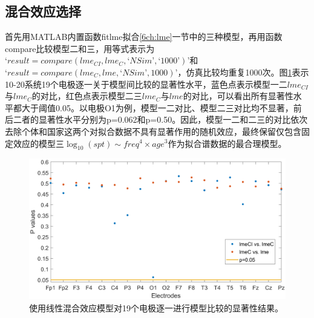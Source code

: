 \subsection{混合效应选择}
首先用MATLAB内置函数fitlme拟合\ref{6ch:lme}一节中的三种模型，再用函数compare比较模型二和三，用等式表示为$‘result = compare(lme_{CI}, lme_C, ‘NSim’, ‘1000’)’$和$‘result = compare (lme_C, lme, ‘NSim’, 1000)’$，仿真比较均重复1000次。图\ref{6:pv}表示10-20系统19个电极逐一关于模型间比较的显著性水平，蓝色点表示模型一二$lme_{CI}$与$lme_C$的对比，红色点表示模型二三$lme_C$与$lme$的对比，可以看出所有显著性水平都大于阈值0.05。以电极O1为例，模型一二对比、模型二三对比均不显著，前后二者的显著性水平分别为p=0.062和p=0.50。因此，模型一二和二三的对比依次去除个体和国家这两个对拟合数据不具有显著作用的随机效应，最终保留仅包含固定效应的模型三$\log_{10}(spt)\sim{freq^4\times{age^3}}$作为拟合谱数据的最合理模型。
\begin{figure}[!ht]
\includegraphics[width=15cm]{pic/Norm/figure5.png}
\caption{使用线性混合效应模型对19个电极逐一进行模型比较的显著性结果。}
\label{6:pv}
\end{figure}

